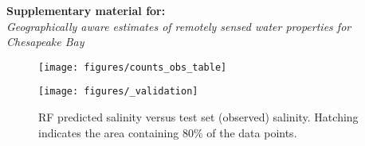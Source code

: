 \documentclass[12pt]{article}
\begin{document}
\begin{center}
\textbf{Supplementary material for:}\\
\emph{Geographically aware estimates of remotely sensed water properties for Chesapeake Bay}
\end{center}

\begin{figure}[h!]
    \begin{center}
          \texttt{[image: figures/counts\_obs\_table]}
    \end{center}    
\end{figure}

\begin{figure}[h!]
    \begin{center}
          \texttt{[image: figures/\_validation]}
          \caption{RF predicted salinity versus test set (observed) salinity. Hatching indicates the area containing 80\% of the data points.}
    \end{center}    
\end{figure}

\clearpage
\end{document}
